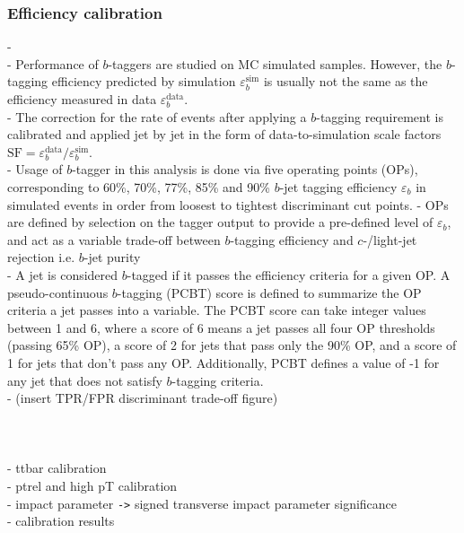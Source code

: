 \documentclass[../thesis.tex]{subfiles}
\begin{document}
\subsubsection*{Efficiency calibration}
- \citep{ftag:calib}\\
- Performance of $b$-taggers are studied on MC simulated samples. However, the $b$-tagging efficiency predicted by simulation $\varepsilon_b^\mathrm{sim}$ is usually not the same as the efficiency measured in data $\varepsilon_b^\mathrm{data}$.\\
- The correction for the rate of events after applying a $b$-tagging requirement is calibrated and applied jet by jet in the form of data-to-simulation scale factors $\mathrm{SF}=\varepsilon_b^\mathrm{data}/\varepsilon_b^\mathrm{sim}$.\\
- Usage of $b$-tagger in this analysis is done via five operating points (OPs), corresponding to 60\%, 70\%, 77\%, 85\% and 90\% $b$-jet tagging efficiency $\varepsilon_b$ in simulated \ttbar events in order from loosest to tightest discriminant cut points.
- OPs are defined by selection on the tagger output to provide a pre-defined level of $\varepsilon_b$, and act as a variable trade-off between $b$-tagging efficiency and $c$-/light-jet rejection i.e. $b$-jet purity \\
- A jet is considered $b$-tagged if it passes the efficiency criteria for a given OP. A pseudo-continuous $b$-tagging (PCBT) score is defined to summarize the OP criteria a jet passes into a variable. The PCBT score can take integer values between 1 and 6, where a score of 6 means a jet passes all four OP thresholds (passing 65\% OP), a score of 2 for jets that pass only the 90\% OP, and a score of 1 for jets that don't pass any OP. Additionally, PCBT defines a value of -1 for any jet that does not satisfy $b$-tagging criteria.\\
- (insert TPR/FPR discriminant trade-off figure)\\
\\
\\
\\
- ttbar calibration \citep{ftag:ttbar}\\
- ptrel and high pT calibration \citep{ftag:multijet}\citep{ftag:highpt}\citep{ftag:ptrel}\\
- impact parameter \verb|->| signed transverse impact parameter significance\\
- calibration results
\end{document}
